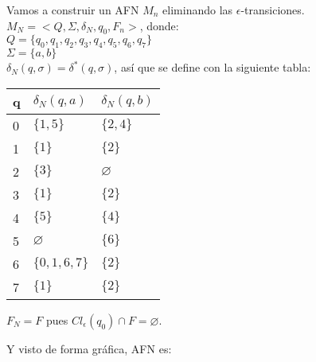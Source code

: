 \documentclass{article}
\begin{document}
\begin{enumerate}
{\begin{enumerate}
{			Vamos a construir un AFN $M_{n}$ eliminando las $\epsilon$-transiciones.\\
			
			$M_{N} = <Q, \Sigma, \delta_{N}, q_{0}, F_{n}>$, donde:\\
			
			$Q = \{q_{0}, q_{1}, q_{2}, q_{3}, q_{4}, q_{5}, q_{6}, q_{7}\}$\\
			$\Sigma = \{a, b\}$\\
			$\delta_{N}(q, \sigma) = \delta^*(q, \sigma)$, así que se define con la siguiente tabla:\\
			 
			 \begin{table}[H]
			 	\centering
			 	\begin{tabular}{|l|l|l|}
			 		\hline
			 		q & $\delta_{N} (q,a)$ & $\delta_{N} (q,b)$ \\ \hline
			 		0 & $\{1, 5\}$         & $\{2, 4\}$         \\ \hline
			 		1 & $\{1\}$            & $\{2\}$            \\ \hline
			 		2 & $\{3\}$            & $\varnothing$      \\ \hline
			 		3 & $\{1\}$            & $\{2\}$            \\ \hline
			 		4 & $\{5\}$            & $\{4\}$            \\ \hline
			 		5 & $\varnothing$      & $\{6\}$            \\ \hline
			 		6 & $\{0, 1, 6, 7\}$   & $\{2\}$            \\ \hline
			 		7 & $\{1\}$            & $\{2\}$            \\ \hline
			 	\end{tabular}
			 \end{table}
			 
			 $F_{N} = F$ pues $Cl_{\epsilon}(q_{0}) \cap F = \varnothing$.
			 
			 Y visto de forma gráfica, AFN es:
			 
			 	\begin{figure} [H]
			 	\centering
\end{figure}}
\end{enumerate}}
\end{enumerate}
\end{document}
